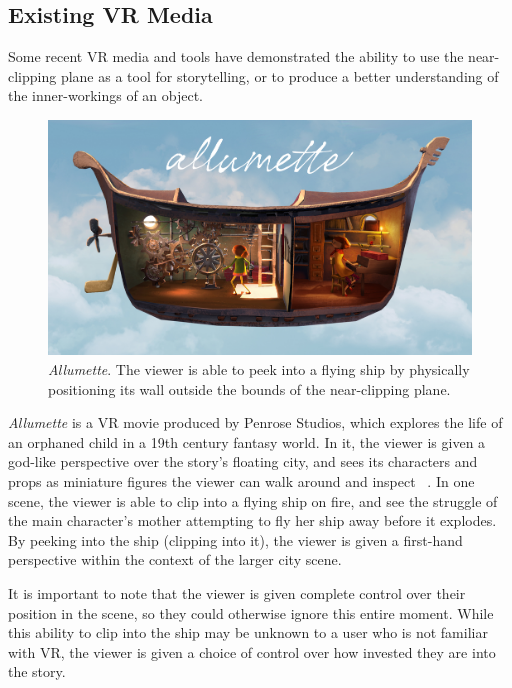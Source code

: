 \documentclass[10pt,twocolumn,letterpaper]{article}
\begin{document}
\subsection{Existing VR Media} \label{existingmedia}

Some recent VR media and tools have demonstrated the ability to use the near-clipping plane as a tool for storytelling, or to produce a better understanding of the inner-workings of an object.

\begin{figure}[t]
\begin{center}
\includegraphics[width=1.0\linewidth]{images/allumette.jpg}
\end{center}
   \caption{\textit{Allumette}.  The viewer is able to peek into a flying ship by physically positioning its wall outside the bounds of the near-clipping plane. }
\label{fig:long}
\label{fig:onecol}
\end{figure}

\textit{Allumette} is a VR movie produced by Penrose Studios, which explores the life of an orphaned child in a 19th century fantasy world. In it, the viewer is given a god-like perspective over the story's floating city, and sees its characters and props as miniature figures the viewer can walk around and inspect ~\cite{Allumette}. In one scene, the viewer is able to clip into a flying ship on fire, and see the struggle of the main character's mother attempting to fly her ship away before it explodes. By peeking into the ship (clipping into it), the viewer is given a first-hand perspective within the context of the larger city scene.

It is important to note that the viewer is given complete control over their position in the scene, so they could otherwise ignore this entire moment. While this ability to clip into the ship may be unknown to a user who is not familiar with VR, the viewer is given a choice of control over how invested they are into the story.\\
\end{document}
